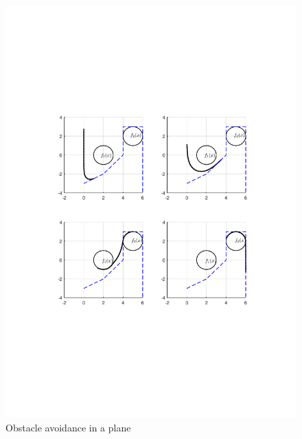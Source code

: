 \documentclass[12pt,a4]{article}
\begin{document}
\begin{figure}[h!]
\centering
\includegraphics[scale=0.75]{figures/fig3.pdf}
\caption{Obstacle avoidance in a plane\label{fig:obstacle_avoidance_2D}}
\end{figure}
\end{document}
